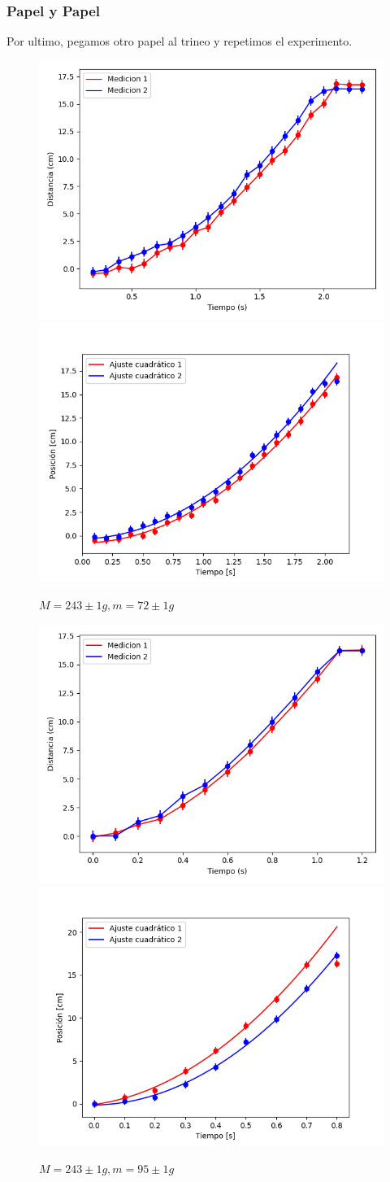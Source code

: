 \documentclass[12pt,a4]{article}
\begin{document}
\subsubsection*{Papel y Papel}

Por ultimo, pegamos otro papel al trineo y repetimos el experimento.

\begin{figure}[H]
    \centering
    \includegraphics[width=0.4\linewidth]{TiempoVsDistanciaPapelPapelM_O.png}
    \includegraphics[width=0.44\linewidth]{ajuste2_PapelPapelM_O.png}
    \caption{$M = 243 \pm 1 g, m = 72 \pm 1 g$}
    \label{fig:M_O papel papel}
\end{figure}

\begin{figure}[H]
    \centering
    \includegraphics[width=0.4\linewidth]{TiempoVsDistanciaPapelPapelM_OP.png}
    \includegraphics[width=0.44\linewidth]{ajuste2_PapelPapelM_OP.png}
    \caption{$M = 243 \pm 1 g, m = 95 \pm 1 g$}
    \label{fig:M_OP papel papel}
\end{figure}
\end{document}
